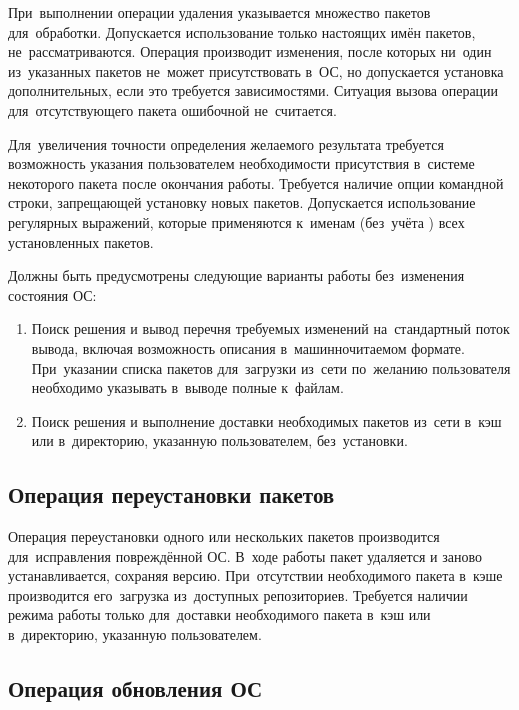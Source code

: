 При~выполнении операции удаления указывается множество пакетов для~обработки.
Допускается использование только настоящих имён пакетов,  не~рассматриваются.
Операция производит изменения, после которых ни~один из~указанных пакетов не~может присутствовать в~ОС,
но допускается установка дополнительных, если это требуется зависимостями. 
Ситуация вызова операции для~отсутствующего пакета ошибочной не~считается.

Для~увеличения точности определения желаемого результата требуется возможность указания пользователем 
необходимости  присутствия в~системе некоторого пакета после окончания работы.
Требуется наличие опции командной строки, запрещающей установку новых пакетов. 
Допускается использование регулярных выражений,
которые применяются к~именам (без~учёта ) всех установленных пакетов.

Должны быть предусмотрены следующие варианты работы без~изменения состояния ОС:

\begin{enumerate}

\item {
Поиск решения и вывод перечня требуемых изменений на~стандартный поток вывода,
включая возможность описания в~машинночитаемом формате.
При~указании списка пакетов для~загрузки из~сети по~желанию пользователя необходимо указывать в~выводе полные  к~файлам.
}

\item {
Поиск решения и выполнение доставки необходимых пакетов из~сети в~кэш или в~директорию, указанную пользователем, без~установки.
}

\end{enumerate}

\subsection{Операция переустановки пакетов}

Операция переустановки одного или нескольких пакетов производится для~исправления повреждённой ОС.
В~ходе работы пакет удаляется и заново устанавливается, сохраняя версию.
При~отсутствии необходимого пакета в~кэше производится  его~загрузка из~доступных репозиториев.
Требуется наличии режима работы только для~доставки необходимого пакета в~кэш или в~директорию, указанную пользователем.

\subsection{Операция обновления ОС}

